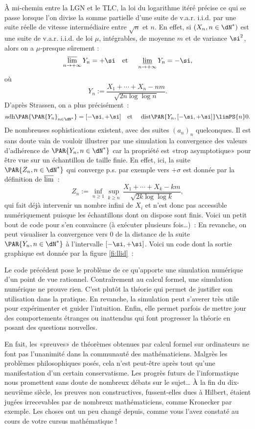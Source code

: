 À mi-chemin entre la LGN et le TLC, la loi du logarithme itéré précise ce qui
se passe lorsque l'on divise la somme partielle d'une suite de v.a.r. i.i.d.
par une suite réelle de vitesse intermédiaire entre $\sqrt{n}$ et $n$. En
effet, si $(X_n,n\in\dN^*)$ est une suite de v.a.r. i.i.d. de loi $\mu$,
intégrables, de moyenne $m$ et de variance $\si^2$, alors on a $\mu$-presque
sûrement :
$$
\varlimsup_{n\to+\infty} Y_n=+\si 
\text{\quad et \quad} 
\varliminf_{n\to+\infty} Y_n=-\si,
$$
où
$$
Y_n:=\frac{X_1+\cdots+X_n-nm}{\sqrt{2n\log\log n}}.
$$
D'après Strassen, on a plus précisément~:
$$
\mathrm{adh}\PAR{\PAR{Y_n}_{n\in\dN^*}}=[-\si,+\si]
\text{\quad et \quad}
\mathrm{dist}\PAR{Y_n,[-\si,+\si]}\limPS{n} 0.
$$
De nombreuses sophistications existent, avec des suites $(a_n)_n$
quelconques. Il est sans doute vain de vouloir illustrer par une simulation la
convergence des valeurs d'adhérence de $\PAR{Y_n,n\in\dN^*}$ car la propriété
est «trop asymptotique» pour être vue sur un échantillon de taille finie. En
effet, ici, la suite $\PAR{Z_n,n\in\dN^*}$ qui converge p.s. par exemple vers
$+\sigma$ est donnée par la définition de $\varlimsup$~:
$$
Z_n:=\inf_{n\geq 1}\sup_{k\geq n}\,\frac{X_1+\cdots+X_k-km}{\sqrt{2k\log\log k}},
$$
qui fait déjà intervenir un nombre infini de $X_i$ et n'est donc pas
accessible numériquement puisque les échantillons dont on dispose sont finis.
Voici un petit bout de code pour s'en convaincre (à exécuter plusieurs
fois\ldots)~:
%
%
En revanche, on peut visualiser la convergence vers $0$ de la distance de la
suite $\PAR{Y_n,n\in\dN^*}$ à l'intervalle $[-\si,+\si]$. Voici un code \ML{}
dont la sortie graphique est donnée par la figure \ref{fi:llid}~:
%
%
%
\begin{remark}
  Le code précédent pose le problème de ce qu'apporte une simulation numérique
  d'un point de vue rationnel. Contraîrement au calcul formel, une simulation
  numérique ne prouve rien. C'est plutôt la théorie qui permet de justifier
  son utilisation dans la pratique. En revanche, la simulation peut s'averer
  très utile pour expérimenter et guider l'intuition. Enfin, elle permet
  parfois de mettre jour des comportements étranges ou inattendus qui font
  progresser la théorie en posant des questions nouvelles.
  
  En fait, les «preuves» de théorèmes obtenues par calcul formel sur
  ordinateurs ne font pas l'unanimité dans la communauté des mathématiciens.
  Malgrès les problèmes philosophiques posés, cela n'est peut-être après tout
  qu'une manifestation d'un certain conservatisme. Les progrès futurs de
  l'informatique nous promettent sans doute de nombreux débats sur le
  sujet\ldots{} À la fin du dix-neuvième siècle, les preuves non
  constructives, fussent-elles dues à Hilbert, étaient jugées irrecevables par
  de nombreux mathématiciens, comme Kronecker par exemple. Les choses ont un
  peu changé depuis, comme vous l'avez constaté au cours de votre cursus
  mathématique !
\end{remark}


